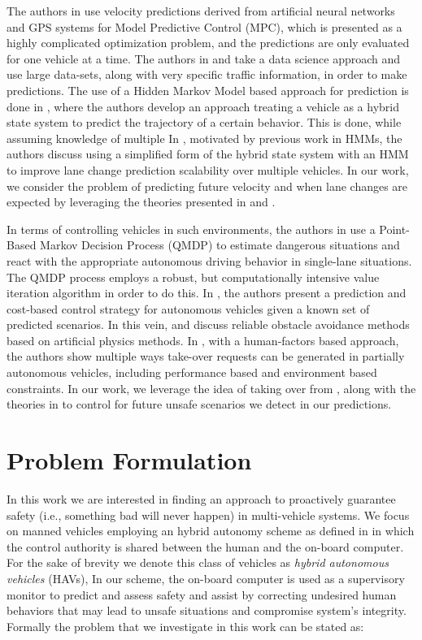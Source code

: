 \documentclass[letterpaper, 10 pt, conference]{ieeeconf}  %
\begin{document}
The authors in \cite{mpc} use velocity predictions derived from artificial neural networks and GPS systems for Model Predictive Control (MPC), which is presented as a highly complicated optimization problem, and the predictions are only evaluated for one vehicle at a time. The authors in \cite{velnn} and \cite{veldatadriv} take a data science approach and use large data-sets, along with very specific traffic information, in order to make predictions. The use of a Hidden Markov Model based approach for prediction is done in \cite{lanhmm}, where the authors develop an approach treating a vehicle as a hybrid state system to predict the trajectory of a certain behavior. This is done, while assuming knowledge of multiple In \cite{woohmm}, motivated by previous work in HMMs, the authors discuss using a simplified form of the hybrid state system with an HMM to improve lane change prediction scalability over multiple vehicles. In our work, we consider the problem of predicting future velocity and when lane changes are expected by leveraging the theories presented in \cite{mpc} and \cite{woohmm}. 

In terms of controlling vehicles in such environments, the authors in \cite{qmdp} use a Point-Based Markov Decision Process (QMDP) to estimate dangerous situations and react with the appropriate autonomous driving behavior in single-lane situations. The QMDP process employs a robust, but computationally intensive value iteration algorithm in order to do this. In \cite{predcost}, the authors present a prediction and cost-based control strategy for autonomous vehicles given a known set of predicted scenarios. In this vein, \cite{vfh+} and \cite{vfh*} discuss reliable obstacle avoidance methods based on artificial physics methods. In \cite{takeover}, with a human-factors based approach, the authors show multiple ways take-over requests can be generated in partially autonomous vehicles, including performance based and environment based constraints. In our work, we leverage the idea of taking over from \cite{takeover}, along with the theories in \cite{vfh*} to control for future unsafe scenarios we detect in our predictions.
    
\section{Problem Formulation} \label{sec:probform}
 
In this work we are interested in finding an approach to proactively guarantee safety (i.e., something bad will never happen) in multi-vehicle systems. We focus on manned vehicles employing an hybrid autonomy scheme as defined in \cite{} in which the control authority is shared between the human and the on-board computer. For the sake of brevity we denote this class of vehicles as {\em hybrid autonomous vehicles} (HAVs), In our scheme, the on-board computer is used as a supervisory monitor to predict and assess safety and assist by correcting undesired human behaviors that may lead to unsafe situations and compromise system's integrity. 
Formally the problem that we investigate in this work can be stated as: 
\end{document}
